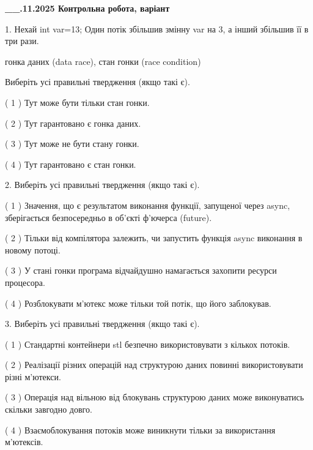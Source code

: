 \documentclass[12pt, ukrainian]{article}
\begin{document}
\newpage
\begin {large}

\textbf{\_\_.11.2025 Контрольна робота, варіант  }\par


{
1. Нехай int var=13; Один потік збільшив змінну var на 3, а інший збільшив її в три рази.

гонка даних (data race), стан гонки (race condition)

Виберіть усі правильні твердження (якщо такі є).\par
\vspace{2mm}
( 1 ) Тут може бути тільки стан гонки.%

( 2 ) Тут гарантовано є гонка даних.%

( 3 ) Тут може не бути стану гонки.%

( 4 ) Тут гарантовано є стан гонки.%


2. Виберіть усі правильні твердження (якщо такі є).\par
\vspace{2mm}

( 1 ) Значення, що є результатом виконання функції, запущеної через async, зберігається безпосередньо в об’єкті ф’ючерса (future).%

( 2 ) Тільки від компілятора залежить, чи запустить функція async виконання в новому потоці.%

( 3 ) У стані гонки програма відчайдушно намагається захопити ресурси процесора.%

( 4 ) Розблокувати м’ютекс може тільки той потік, що його заблокував.%


3. Виберіть усі правильні твердження (якщо такі є).\par
\vspace{2mm}

( 1 ) Стандартні контейнери stl безпечно використовувати з кількох потоків.%

( 2 ) Реалізації різних операцій над структурою даних повинні використовувати різні м’ютекси.%

( 3 ) Операція над вільною від блокувань структурою даних може виконуватись скільки завгодно довго.%

( 4 ) Взаємоблокування потоків може виникнути тільки за використання м’ютексів.%


}
\end{large}
\end{document}
